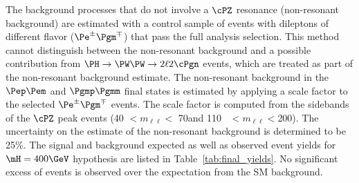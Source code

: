 The background processes that do not involve a $\cPZ$ resonance (non-resonant background)
are estimated with a control sample of events with dileptons of different flavor
($\Pe^{\pm}\Pgm^{\mp}$) that pass the full analysis selection.
This method cannot distinguish between the non-resonant background and
a possible contribution from $\PH \rightarrow \PW\PW \rightarrow 2\ell 2\cPgn$ events, which are treated
as part of the non-resonant background estimate.
The non-resonant background in the $\Pep\Pem$ and $\Pgmp\Pgmm$ final states
is estimated by applying a scale factor to the selected
$\Pe^{\pm}\Pgm^{\mp}$ events.
The scale factor is computed from the sidebands of the $\cPZ$ peak events
(40 $< m_{\ell\ell} <$ 70\GeV and 110~ $< m_{\ell\ell} <$200\GeV).
The uncertainty on the estimate of the
non-resonant background is determined to be 25\%. 
The signal and background expected as well as observed event yields for 
$\mH=400\GeV$ hypothesis are 
listed in Table~\ref{tab:final_yields}.
No significant excess of events is observed over the expectation from the SM background.

